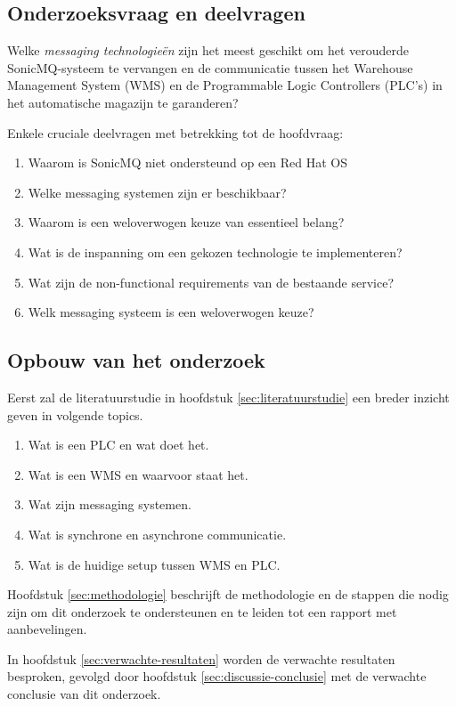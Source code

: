 \subsection{Onderzoeksvraag en deelvragen}
Welke \emph{messaging technologieën} zijn het meest geschikt om het verouderde SonicMQ-systeem te vervangen 
en de communicatie tussen het Warehouse Management System (WMS) en de Programmable Logic Controllers (PLC’s) 
in het automatische magazijn te garanderen?

Enkele cruciale deelvragen met betrekking tot de hoofdvraag:
\begin{enumerate}
  \item Waarom is SonicMQ niet ondersteund op een Red Hat OS
  \item Welke messaging systemen zijn er beschikbaar?
  \item Waarom is een weloverwogen keuze van essentieel belang?
  \item Wat is de inspanning om een gekozen technologie te implementeren?
  \item Wat zijn de non-functional requirements van de bestaande service?
  \item Welk messaging systeem is een weloverwogen keuze?
\end{enumerate}

\newpage

\subsection{Opbouw van het onderzoek}
Eerst zal de literatuurstudie in hoofdstuk \ref{sec:literatuurstudie} een breder inzicht geven in volgende topics.
\begin{enumerate}
  \item Wat is een PLC en wat doet het.
  \item Wat is een WMS en waarvoor staat het.
  \item Wat zijn messaging systemen.
  \item Wat is synchrone en asynchrone communicatie. 
  \item Wat is de huidige setup tussen WMS en PLC.
\end{enumerate}

Hoofdstuk \ref{sec:methodologie} beschrijft de methodologie en de stappen die nodig zijn om dit onderzoek te ondersteunen
en te leiden tot een rapport met aanbevelingen. 

In hoofdstuk \ref{sec:verwachte-resultaten} worden de verwachte resultaten besproken, gevolgd door 
hoofdstuk \ref{sec:discussie-conclusie} met de verwachte conclusie van dit onderzoek.

